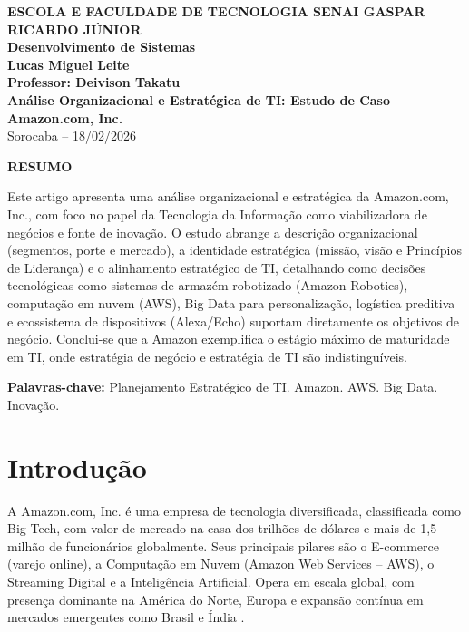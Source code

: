 \documentclass[12pt,a4paper,oneside]{article}
\begin{document}
\begin{center}
  \textbf{\large ESCOLA E FACULDADE DE TECNOLOGIA SENAI GASPAR RICARDO JÚNIOR}\\
  \textbf{Desenvolvimento de Sistemas}\\[1cm]
  \textbf{\Large Lucas Miguel Leite}\\[0.5cm]
  \textbf{Professor: Deivison Takatu}\\[2cm]
  \textbf{\LARGE\textbf{Análise Organizacional e Estratégica de TI: Estudo de Caso Amazon.com, Inc.}}\\[1cm]
  Sorocaba -- 18/02/2026
\end{center}

\vspace{1cm}

\begin{center}
  \textbf{RESUMO}
\end{center}

Este artigo apresenta uma análise organizacional e estratégica da Amazon.com, Inc., com foco no papel da Tecnologia da Informação como viabilizadora de negócios e fonte de inovação. O estudo abrange a descrição organizacional (segmentos, porte e mercado), a identidade estratégica (missão, visão e Princípios de Liderança) e o alinhamento estratégico de TI, detalhando como decisões tecnológicas como sistemas de armazém robotizado (Amazon Robotics), computação em nuvem (AWS), Big Data para personalização, logística preditiva e ecossistema de dispositivos (Alexa/Echo) suportam diretamente os objetivos de negócio. Conclui-se que a Amazon exemplifica o estágio máximo de maturidade em TI, onde estratégia de negócio e estratégia de TI são indistinguíveis.

\vspace{0.5cm}
\textbf{Palavras-chave:} Planejamento Estratégico de TI. Amazon. AWS. Big Data. Inovação.

\newpage

\section{Introdução}

A Amazon.com, Inc. é uma empresa de tecnologia diversificada, classificada como Big Tech, com valor de mercado na casa dos trilhões de dólares e mais de 1,5 milhão de funcionários globalmente. Seus principais pilares são o E-commerce (varejo online), a Computação em Nuvem (Amazon Web Services -- AWS), o Streaming Digital e a Inteligência Artificial. Opera em escala global, com presença dominante na América do Norte, Europa e expansão contínua em mercados emergentes como Brasil e Índia \cite{amazon2026}.
\end{document}
